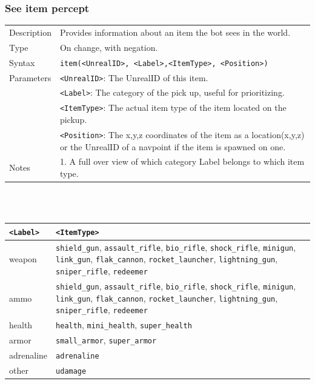 \documentclass[11pt,a4paper]{article}
\begin{document}
\subsubsection*{See item percept}
\begin{small}
\begin{tabular}{p{2cm}p{9cm}}
Description & Provides information about an item the bot sees in the world.\\
Type & On change, with negation.\\
Syntax & \verb|item(<UnrealID>, <Label>,<ItemType>, <Position>)|\\ 
Parameters &
\verb|<UnrealID>|: The UnrealID of this item.\\
& \verb|<Label>|: The category of the pick up, useful for prioritizing.\\
& \verb|<ItemType>|: The actual item type of the item located on the pickup. \\
& \verb|<Position>|: The x,y,z coordinates of the item as a location(x,y,z) or the UnrealID of a navpoint if the item is spawned on one.\\
Notes &
	1.	A full over view of which category Label belongs to which item type.
\end{tabular}
\end{small}
\\\\
\begin{small}
\begin{tabular}{|p{2cm}|p{9cm}|}	
	\hline
\verb|<Label>| & \verb|<ItemType>|\\
\hline
weapon &
\verb|shield_gun|, \verb|assault_rifle|, \verb|bio_rifle|, \verb|shock_rifle|, \verb|minigun|, \verb|link_gun|, \verb|flak_cannon|, \verb|rocket_launcher|, \verb|lightning_gun|, \verb|sniper_rifle|, \verb|redeemer|\\
ammo &
\verb|shield_gun|, \verb|assault_rifle|, \verb|bio_rifle|, \verb|shock_rifle|, \verb|minigun|, \verb|link_gun|, \verb|flak_cannon|, \verb|rocket_launcher|, \verb|lightning_gun|, \verb|sniper_rifle|, \verb|redeemer|\\
health & \verb|health|, \verb|mini_health|, \verb|super_health|\\
armor & \verb|small_armor|, \verb|super_armor|\\
adrenaline & \verb|adrenaline|\\
other & \verb|udamage|\\
 \hline
\end{tabular}
\end{small}
\end{document}
